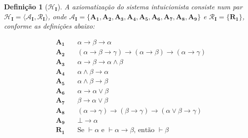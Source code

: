 \documentclass{report}
\newtheorem{definition}{Definição}
\begin{document}
    \begin{definition}[$\mathcal{H}_\mathbf{I}$]
        A axiomatização do sistema intuicionista consiste num par $\mathcal{H}_\mathbf{I} = \langle\mathcal{A}_\mathbf{I}, \mathcal{R}_\mathbf{I}\rangle$, onde $\mathcal{A}_\mathbf{I} = \{\mathbf{A_1}, \mathbf{A_2}, \mathbf{A_3}, \mathbf{A_4}, \mathbf{A_5}, \mathbf{A_6}, \mathbf{A_7}, \mathbf{A_8}, \mathbf{A_9}\}$ e $\mathcal{R}_\mathbf{I} = \{\mathbf{R_1}\}$, conforme as definições abaixo:

        \begin{align*}
            & \mathbf{A_1}\quad & \alpha\to\beta\to\alpha \\
            & \mathbf{A_2}\quad & (\alpha\to\beta\to\gamma)\to(\alpha\to\beta)\to(\alpha\to\gamma) \\
            & \mathbf{A_3}\quad & \alpha\to\beta\to\alpha\wedge\beta \\
            & \mathbf{A_4}\quad & \alpha\wedge\beta\to\alpha \\
            & \mathbf{A_5}\quad & \alpha\wedge\beta\to\beta \\
            & \mathbf{A_6}\quad & \alpha\to\alpha\vee\beta \\
            & \mathbf{A_7}\quad & \beta\to\alpha\vee\beta \\
            & \mathbf{A_8}\quad & (\alpha\to\gamma)\to(\beta\to\gamma)\to(\alpha\vee\beta\to\gamma) \\
            & \mathbf{A_9}\quad & \bot\to\alpha \\
            & \mathbf{R_1}\quad & \text{Se }\vdash\alpha\text{ e }\vdash\alpha\to\beta\text{, então }\vdash\beta
            \tag*{\qed}
        \end{align*}   
    \end{definition}
\end{document}

